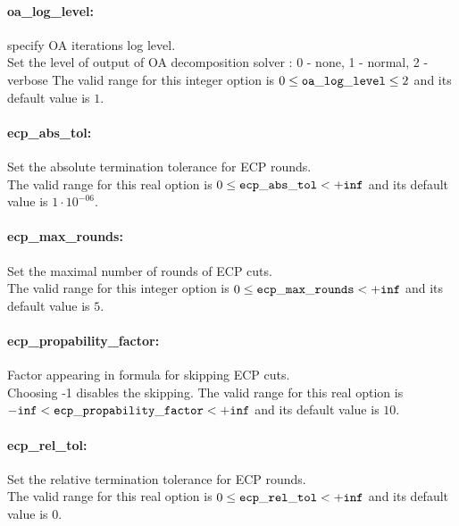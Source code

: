 \paragraph{oa\_log\_level:}\label{sec:oa_log_level} specify OA iterations log level. $\;$ \\
 Set the level of output of OA decomposition
solver : 0 - none, 1 - normal, 2 - verbose The valid range for this integer option is
$0 \le {\tt oa\_log\_level } \le 2$
and its default value is $1$.


\paragraph{ecp\_abs\_tol:}\label{sec:ecp_abs_tol} Set the absolute termination tolerance for ECP rounds. $\;$ \\
 The valid range for this real option is 
$0 \le {\tt ecp\_abs\_tol } <  {\tt +inf}$
and its default value is $1 \cdot 10^{-06}$.


\paragraph{ecp\_max\_rounds:}\label{sec:ecp_max_rounds} Set the maximal number of rounds of ECP cuts. $\;$ \\
 The valid range for this integer option is
$0 \le {\tt ecp\_max\_rounds } <  {\tt +inf}$
and its default value is $5$.


\paragraph{ecp\_propability\_factor:}\label{sec:ecp_propability_factor} Factor appearing in formula for skipping ECP cuts. $\;$ \\
 Choosing -1 disables the skipping. The valid range for this real option is 
${\tt -inf} <  {\tt ecp\_propability\_factor } <  {\tt +inf}$
and its default value is $10$.


\paragraph{ecp\_rel\_tol:}\label{sec:ecp_rel_tol} Set the relative termination tolerance for ECP rounds. $\;$ \\
 The valid range for this real option is 
$0 \le {\tt ecp\_rel\_tol } <  {\tt +inf}$
and its default value is $0$.


